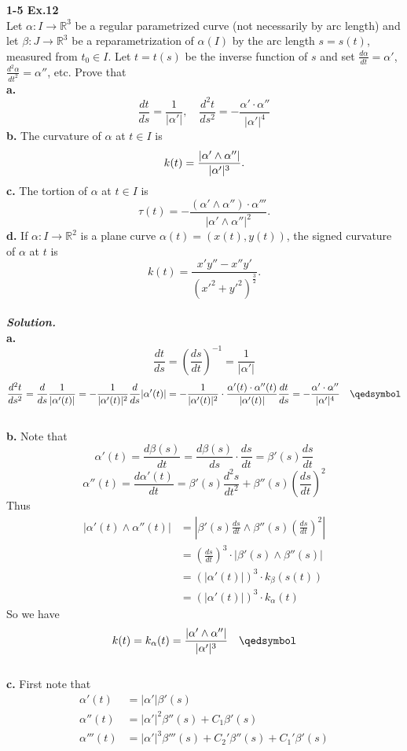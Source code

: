 \documentclass{article}
\begin{document}
\par
\textbf{1-5 Ex.12}\\
Let $\alpha: I \to \mathbb{R}^3$ be a regular parametrized curve (not necessarily by arc length) and let $\beta: J \to \mathbb{R}^3$ be
a reparametrization of $\alpha(I)$ by the arc length $s = s(t)$, measured from $t_0 \in I$. Let $t = t(s)$
be the inverse function of $s$ and set $\frac{d\alpha}{dt}=\alpha'$, $\frac{d^2\alpha}{dt^2}=\alpha''$, etc.
Prove that\\
\textbf{a. }
$$
    \frac{dt}{ds}=\frac{1}{|\alpha'|}, \quad \frac{d^2t}{ds^2} = -\frac{\alpha' \cdot \alpha''}{|\alpha'|^4}
$$
\textbf{b. }The curvature of $\alpha$ at $t \in I$ is 
$$
    k(t) = \frac{|\alpha' \wedge \alpha''|}{|\alpha'|^3}.\\
$$
\textbf{c. }The tortion of $\alpha$ at $t \in I$ is
$$
    \tau(t) = - \frac{(\alpha' \wedge \alpha'') \cdot \alpha'''}{|\alpha' \wedge \alpha''|^2}.
$$
\textbf{d. }If $\alpha: I \to \mathbb{R}^2$ is a plane curve $\alpha(t) = (x(t), y(t))$, the signed curvature
of $\alpha$ at $t$ is
$$
    k(t) = \frac{x'y'' - x''y'}{(x'^2 + y'^2)^{\frac{3}{2}}}.
$$
\\
\textbf{\textit{Solution.}}\\
\textbf{a. }
$$
    \frac{dt}{ds} = (\frac{ds}{dt})^{-1} = \frac{1}{|\alpha'|}
$$
$$
    \frac{d^2t}{ds^2} = \frac{d}{ds} \frac{1}{|\alpha'(t)|} = -\frac{1}{|\alpha'(t)|^2} \frac{d}{ds}|\alpha'(t)| 
    = -\frac{1}{|\alpha'(t)|^2} \cdot \frac{\alpha'(t) \cdot \alpha''(t)}{|\alpha'(t)|} \frac{dt}{ds} = - \frac{\alpha' \cdot \alpha''}{|\alpha'|^4} \quad \qedsymbol
$$
\\
\textbf{b. } Note that
$$
    \alpha'(t) = \frac{d\beta(s)}{dt} = \frac{d\beta(s)}{ds}\cdot \frac{ds}{dt} = \beta'(s)\frac{ds}{dt}
$$
$$
    \alpha''(t) = \frac{d\alpha'(t)}{dt} = \beta'(s)\frac{d^2s}{dt^2} + \beta''(s)(\frac{ds}{dt})^2
$$
Thus
$$
\begin{aligned}
    |\alpha'(t) \wedge \alpha''(t)| &= |\beta'(s)\frac{ds}{dt} \wedge \beta''(s)(\frac{ds}{dt})^2| \\
    &= (\frac{ds}{dt})^3 \cdot |\beta'(s) \wedge \beta''(s)|\\
    &= (|\alpha'(t)|)^3 \cdot k_{\beta}(s(t)) \\
    &= (|\alpha'(t)|)^3 \cdot k_{\alpha}(t)
\end{aligned}
$$
So we have
$$
    k(t) = k_{\alpha}(t) = \frac{|\alpha' \wedge \alpha''|}{|\alpha'|^3} \quad \qedsymbol
$$
\\
\textbf{c.}
First note that
$$
    \begin{aligned}
        \alpha'(t) &= |\alpha'| \beta'(s)\\
        \alpha''(t) &=  |\alpha'|^2 \beta''(s) + C_1 \beta'(s)\\
        \alpha'''(t) &= |\alpha'|^3 \beta'''(s) + C_2' \beta''(s) + C_1' \beta'(s)
    \end{aligned}
$$
\end{document}
